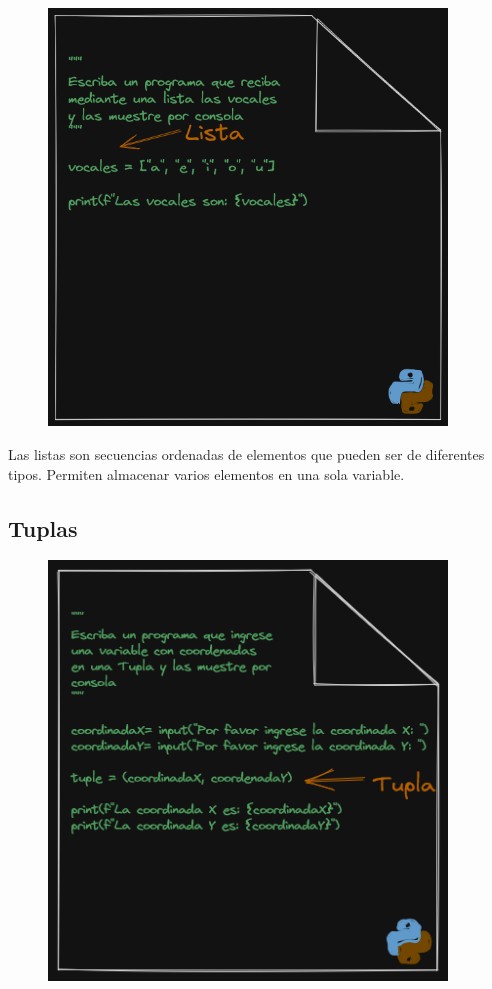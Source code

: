 \documentclass[
  a4paper,
  DIV=11,
  numbers=noendperiod,
  onepage,
  openany]{scrreprt}
\begin{document}
\begin{figure}

{\centering \includegraphics[width=4.16667in,height=\textheight]{unidades/unidad3/images/vocales.png}

}

\end{figure}

Las listas son secuencias ordenadas de elementos que pueden ser de
diferentes tipos. Permiten almacenar varios elementos en una sola
variable.

\subsection{Tuplas}\label{tuplas}

\begin{figure}

{\centering \includegraphics[width=4.16667in,height=\textheight]{unidades/unidad3/images/tuple.png}

}

\end{figure}
\end{document}
